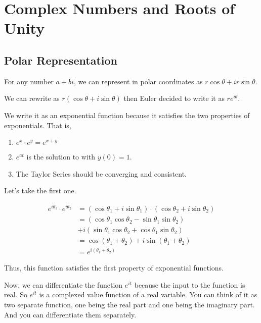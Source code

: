 

\chapter{Complex Numbers and Roots of Unity} 

\bigbreak

\section{Polar Representation}

For any number $a + bi$, we can represent in polar coordinates as $r \cos \theta + i r \sin \theta$.

We can rewrite as $r(\cos \theta + i \sin \theta)$ then Euler decided to write it as $r e^{i \theta}$.

We write it as an exponential function because it satisfies the two properties of exponentials.
That is,
\begin{enumerate}
	\item $e^x \cdot e^y = e^{x+y}$
	\item $e^{at}$ is the solution to  with $y(0) = 1$.
	\item The Taylor Series should be converging and consistent.
\end{enumerate}

Let's take the first one.

\begin{align*}
e^{i\theta_1} \cdot e^{i \theta_2} 
	& = (\cos \theta_1 + i \sin \theta_1) \cdot (\cos \theta_2 + i \sin \theta_2) \\
	& = (\cos \theta_1 \cos \theta_2 - \sin \theta_1 \sin \theta_2) \\
	& + i (\sin \theta_1 \cos \theta_2 + \cos \theta_1 \sin \theta_2) \\
	& = \cos (\theta_1 + \theta_2) + i \sin (\theta_1 + \theta_2) \\
	& = e^{i(\theta_1 + \theta_2)}
\end{align*}

Thus, this function satisfies the first property of exponential functions.

Now, we can differentiate the function $e^{it}$ because the input to the function is real.
So $e^{it}$ is a complexed value function of a real variable. 
You can think of it as two separate function, one being the real part and one being the imaginary part.
And you can differentiate them separately.

